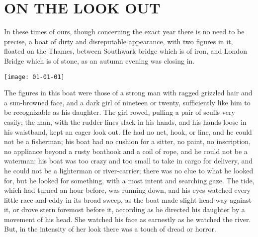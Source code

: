 
\chapter{ON THE LOOK OUT}

In these times of ours, though concerning the exact year there is no
need to be precise, a boat of dirty and disreputable appearance,
with two figures in it, floated on the Thames, between Southwark
bridge which is of iron, and London Bridge which is of stone, as an
autumn evening was closing in.

\texttt{[image: 01-01-01]}

The figures in this boat were those of a strong man with ragged
grizzled hair and a sun-browned face, and a dark girl of nineteen or
twenty, sufficiently like him to be recognizable as his daughter.
The girl rowed, pulling a pair of sculls very easily; the man, with
the rudder-lines slack in his hands, and his hands loose in his
waistband, kept an eager look out. He had no net, hook, or line,
and he could not be a fisherman; his boat had no cushion for a
sitter, no paint, no inscription, no appliance beyond a rusty
boathook and a coil of rope, and he could not be a waterman; his
boat was too crazy and too small to take in cargo for delivery, and
he could not be a lighterman or river-carrier; there was no clue to
what he looked for, but he looked for something, with a most intent
and searching gaze. The tide, which had turned an hour before,
was running down, and his eyes watched every little race and eddy
in its broad sweep, as the boat made slight head-way against it, or
drove stern foremost before it, according as he directed his
daughter by a movement of his head. She watched his face as
earnestly as he watched the river. But, in the intensity of her look
there was a touch of dread or horror.

